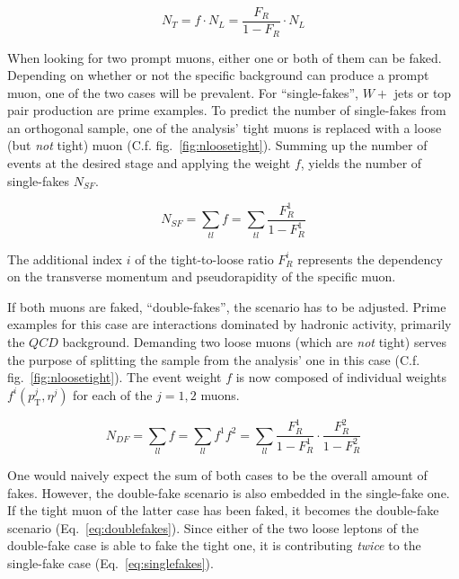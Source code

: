 \begin{equation}
  \label{eq:fakerate}
  N_T = f \cdot N_L = \frac{F_R }{1 - F_R} \cdot N_L
\end{equation}

When looking for two prompt muons, either one or both of them can be faked. Depending on whether or not the specific background can produce a prompt muon, one of the two cases will be prevalent. For ``single-fakes'', $W +$ jets or top pair production are prime examples. To predict the number of single-fakes from an orthogonal sample, one of the analysis' tight muons is replaced with a loose (but \textit{not} tight) muon (C.f. fig.~\ref{fig:nloosetight}). Summing up the number of events at the desired stage and applying the weight $f$, yields the number of single-fakes $N_{SF}$.

\begin{equation}
  \label{eq:singlefakes}
  N_{SF} = \sum_{tl} f = \sum_{tl} \frac{F_R^1}{1 - F_R^1}
\end{equation}

\noindent The additional index $i$ of the tight-to-loose ratio $F_R^i$ represents the dependency on the transverse momentum and pseudorapidity of the specific muon. 

If both muons are faked, ``double-fakes'', the scenario has to be adjusted. Prime examples for this case are interactions dominated by hadronic activity, primarily the $QCD$ background. Demanding two loose muons (which are \textit{not} tight) serves the purpose of splitting the sample from the analysis' one in this case (C.f. fig.~\ref{fig:nloosetight}). The event weight $f$ is now composed of individual weights $f^i (p_{\text{T}}^j, \eta^j)$ for each of the $j = 1, 2$ muons.

\begin{equation}
  \label{eq:doublefakes}
  N_{DF} = \sum_{ll} f = \sum_{ll} f^1 f^2 = \sum_{ll} \frac{F_R^1}{1 - F_R^1} \cdot \frac{F_R^2}{1 - F_R^2}
\end{equation}

One would naively expect the sum of both cases to be the overall amount of fakes. However, the double-fake scenario is also embedded in the single-fake one. If the tight muon of the latter case has been faked, it becomes the double-fake scenario (Eq.~\ref{eq:doublefakes}). Since either of the two loose leptons of the double-fake case is able to fake the tight one, it is contributing \textit{twice} to the single-fake case (Eq.~\ref{eq:singlefakes}).

